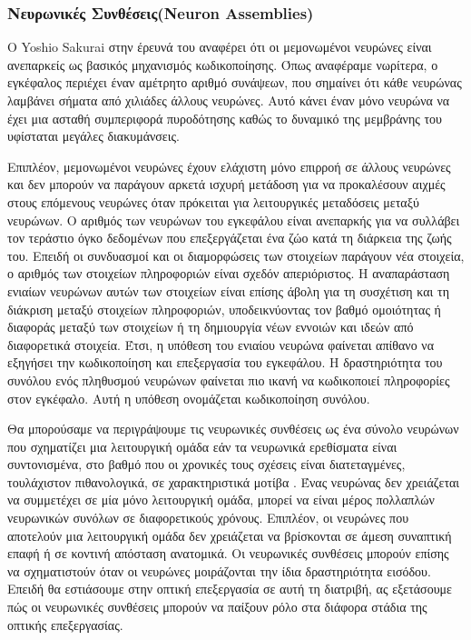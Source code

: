 \documentclass[12pt]{report}
\begin{document}
\subsubsection{Νευρωνικές Συνθέσεις(\textlatin{Neuron Assemblies})}

Ο \textlatin{Yoshio Sakurai} στην έρευνά του \cite{sakurai1999} αναφέρει ότι οι μεμονωμένοι νευρώνες είναι ανεπαρκείς ως βασικός μηχανισμός κωδικοποίησης. Όπως αναφέραμε νωρίτερα, ο εγκέφαλος περιέχει έναν αμέτρητο αριθμό συνάψεων, που σημαίνει ότι κάθε νευρώνας λαμβάνει σήματα από χιλιάδες άλλους νευρώνες. Αυτό κάνει έναν μόνο νευρώνα να έχει μια ασταθή συμπεριφορά πυροδότησης καθώς το δυναμικό της μεμβράνης του υφίσταται μεγάλες διακυμάνσεις.

Επιπλέον, μεμονωμένοι νευρώνες έχουν ελάχιστη μόνο επιρροή σε άλλους νευρώνες και δεν μπορούν να παράγουν αρκετά ισχυρή μετάδοση για να προκαλέσουν αιχμές στους επόμενους νευρώνες όταν πρόκειται για λειτουργικές μεταδόσεις μεταξύ νευρώνων. Ο αριθμός των νευρώνων του εγκεφάλου είναι ανεπαρκής για να συλλάβει τον τεράστιο όγκο δεδομένων που επεξεργάζεται ένα ζώο κατά τη διάρκεια της ζωής του. Επειδή οι συνδυασμοί και οι διαμορφώσεις των στοιχείων παράγουν νέα στοιχεία, ο αριθμός των στοιχείων πληροφοριών είναι σχεδόν απεριόριστος. Η αναπαράσταση ενιαίων νευρώνων αυτών των στοιχείων είναι επίσης άβολη για τη συσχέτιση και τη διάκριση μεταξύ στοιχείων πληροφοριών, υποδεικνύοντας τον βαθμό ομοιότητας ή διαφοράς μεταξύ των στοιχείων ή τη δημιουργία νέων εννοιών και ιδεών από διαφορετικά στοιχεία. Έτσι, η υπόθεση του ενιαίου νευρώνα φαίνεται απίθανο να εξηγήσει την κωδικοποίηση και επεξεργασία του εγκεφάλου. Η δραστηριότητα του συνόλου ενός πληθυσμού νευρώνων φαίνεται πιο ικανή να κωδικοποιεί πληροφορίες στον εγκέφαλο. Αυτή η υπόθεση ονομάζεται κωδικοποίηση συνόλου.

Θα μπορούσαμε να περιγράψουμε τις νευρωνικές συνθέσεις ως ένα σύνολο νευρώνων που σχηματίζει μια λειτουργική ομάδα εάν τα νευρωνικά ερεθίσματα είναι συντονισμένα, στο βαθμό που οι χρονικές τους σχέσεις είναι διατεταγμένες, τουλάχιστον πιθανολογικά, σε χαρακτηριστικά μοτίβα \cite{gerstein1978}. Ένας νευρώνας δεν χρειάζεται να συμμετέχει σε μία μόνο λειτουργική ομάδα, μπορεί να είναι μέρος πολλαπλών νευρωνικών συνόλων σε διαφορετικούς χρόνους. Επιπλέον, οι νευρώνες που αποτελούν μια λειτουργική ομάδα δεν χρειάζεται να βρίσκονται σε άμεση συναπτική επαφή ή σε κοντινή απόσταση ανατομικά. Οι νευρωνικές συνθέσεις μπορούν επίσης να σχηματιστούν όταν οι νευρώνες μοιράζονται την ίδια δραστηριότητα εισόδου. Επειδή θα εστιάσουμε στην οπτική επεξεργασία σε αυτή τη διατριβή, ας εξετάσουμε πώς οι νευρωνικές συνθέσεις μπορούν να παίξουν ρόλο στα διάφορα στάδια της οπτικής επεξεργασίας.
\end{document}
